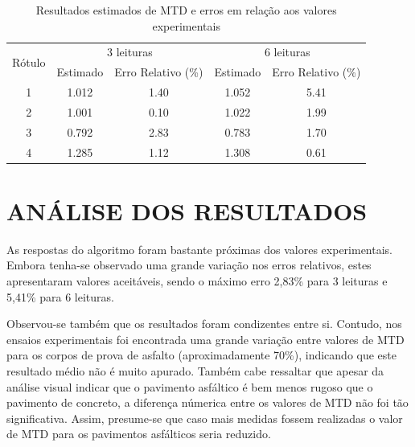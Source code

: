 \begin{table}[htb!]
\centering
\caption{Resultados estimados de MTD e erros em relação aos valores experimentais}
\label{tab:resultadoscomputacionais}
\begin{tabular}{ccccc}
\hline
\multirow{2}{*}{Rótulo} & \multicolumn{2}{c}{3 leituras}                                        & \multicolumn{2}{c}{6 leituras}                                        \\ \cline{2-5} 
                        & \multicolumn{1}{c}{Estimado} & \multicolumn{1}{c}{Erro Relativo (\%)} & \multicolumn{1}{c}{Estimado} & \multicolumn{1}{c}{Erro Relativo (\%)} \\ \hline
1                       & 1.012                        & 1.40                                   & 1.052                        & 5.41                                   \\
2                       & 1.001                        & 0.10                                   & 1.022                        & 1.99                                   \\
3                       & 0.792                        & 2.83                                   & 0.783                        & 1.70                                   \\
4                       & 1.285                        & 1.12                                   & 1.308                        & 0.61                                   \\ \hline
\end{tabular}
\end{table}

\section{ANÁLISE DOS RESULTADOS}

As respostas do algoritmo foram bastante próximas dos valores experimentais. Embora tenha-se observado uma grande variação nos erros relativos, estes apresentaram valores aceitáveis, sendo o máximo erro 2,83\% para 3 leituras e 5,41\% para 6 leituras. 

Observou-se também que os resultados foram condizentes entre si. Contudo, nos ensaios experimentais foi encontrada uma grande variação entre valores de MTD para os corpos de prova de asfalto (aproximadamente 70\%), indicando que este resultado médio não é muito apurado. Também cabe ressaltar que apesar da análise visual indicar que o pavimento asfáltico é bem menos rugoso que o pavimento de concreto, a diferença númerica entre os valores de MTD não foi tão significativa. Assim, presume-se que caso mais medidas fossem realizadas o valor de MTD para os pavimentos asfálticos seria reduzido.  

